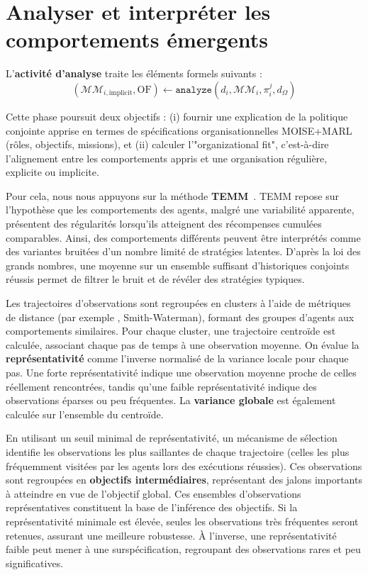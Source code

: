 \chapter{Analyser et interpréter les comportements émergents}
\label{chap:analyzing}

\noindent L'\textbf{activité d'analyse} traite les éléments formels suivants :
\[
    (\mathcal{MM}_{i,\text{implicit}}, \text{OF}) \gets \texttt{analyze}(d_i, \mathcal{MM}_i, \pi^j_i, d_\Omega)
\]

\noindent Cette phase poursuit deux objectifs : (i) fournir une explication de la politique conjointe apprise en termes de spécifications organisationnelles MOISE+MARL (rôles, objectifs, missions), et (ii) calculer l'"organizational fit", c'est-à-dire l'alignement entre les comportements appris et une organisation régulière, explicite ou implicite.

Pour cela, nous nous appuyons sur la méthode \textbf{TEMM}~\cite{soule2025moisemarl}. \ac{TEMM} repose sur l'hypothèse que les comportements des agents, malgré une variabilité apparente, présentent des régularités lorsqu'ils atteignent des récompenses cumulées comparables. Ainsi, des comportements différents peuvent être interprétés comme des variantes bruitées d'un nombre limité de stratégies latentes. D'après la loi des grands nombres, une moyenne sur un ensemble suffisant d'historiques conjoints réussis permet de filtrer le bruit et de révéler des stratégies typiques.

Les trajectoires d'observations sont regroupées en clusters à l'aide de métriques de distance (par exemple , Smith-Waterman), formant des groupes d'agents aux comportements similaires. Pour chaque cluster, une trajectoire centroïde est calculée, associant chaque pas de temps à une observation moyenne. On évalue la \textbf{représentativité} comme l'inverse normalisé de la variance locale pour chaque pas. Une forte représentativité indique une observation moyenne proche de celles réellement rencontrées, tandis qu'une faible représentativité indique des observations éparses ou peu fréquentes. La \textbf{variance globale} est également calculée sur l'ensemble du centroïde.

En utilisant un seuil minimal de représentativité, un mécanisme de sélection identifie les observations les plus saillantes de chaque trajectoire (celles les plus fréquemment visitées par les agents lors des exécutions réussies). Ces observations sont regroupées en \textbf{objectifs intermédiaires}, représentant des jalons importants à atteindre en vue de l'objectif global. Ces ensembles d'observations représentatives constituent la base de l'inférence des objectifs. Si la représentativité minimale est élevée, seules les observations très fréquentes seront retenues, assurant une meilleure robustesse. À l'inverse, une représentativité faible peut mener à une surspécification, regroupant des observations rares et peu significatives.

